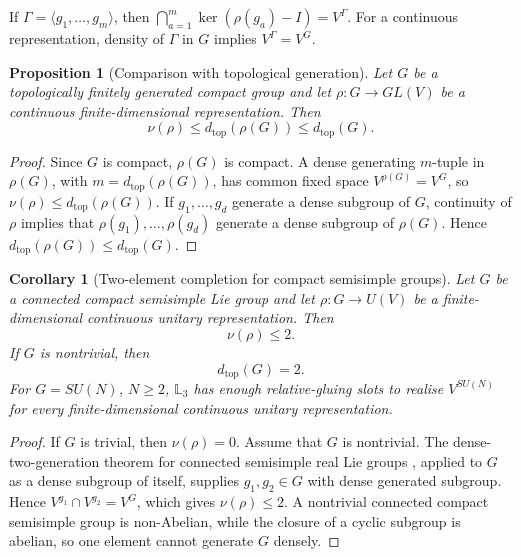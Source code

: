 \documentclass[11pt]{article}
\theoremstyle{plain}
\newtheorem{proposition}[theorem]{Proposition}
\newtheorem{corollary}[theorem]{Corollary}
\theoremstyle{definition}
\begin{document}
If
\(\Gamma=\langle g_1,\ldots,g_m\rangle\),
then
\(\bigcap_{a=1}^{m}\ker(\rho(g_a)-I)=V^\Gamma\).
For a continuous representation, density of \(\Gamma\) in \(G\) implies
\(V^\Gamma=V^G\).

\begin{proposition}[Comparison with topological generation]
\label{prop:completion-generation}
Let \(G\) be a topologically finitely generated compact group and let
\(\rho:G\to GL(V)\) be a continuous finite-dimensional representation. Then
\[
\nu(\rho)
\leq
d_{\mathrm{top}}(\rho(G))
\leq
d_{\mathrm{top}}(G).
\]
\end{proposition}

\begin{proof}
Since \(G\) is compact, \(\rho(G)\) is compact. A dense generating
\(m\)-tuple in \(\rho(G)\), with
\(m=d_{\mathrm{top}}(\rho(G))\), has common fixed space
\(V^{\rho(G)}=V^G\),
so
\(\nu(\rho)\leq d_{\mathrm{top}}(\rho(G))\).
If \(g_1,\ldots,g_d\) generate a dense subgroup of \(G\), continuity of
\(\rho\) implies that \(\rho(g_1),\ldots,\rho(g_d)\) generate a dense subgroup of \(\rho(G)\). Hence
\(d_{\mathrm{top}}(\rho(G))\leq d_{\mathrm{top}}(G)\).
\end{proof}

\begin{corollary}[Two-element completion for compact semisimple groups]
\label{cor:semisimple-two-completion}
Let \(G\) be a connected compact semisimple Lie group and let \(\rho:G\to U(V)\) be a finite-dimensional continuous unitary representation. Then
\[
\nu(\rho)\leq2.
\]
If \(G\) is nontrivial, then
\[
d_{\mathrm{top}}(G)=2.
\]
For \(G=SU(N)\), \(N\geq2\), \(\mathbb L_3\) has enough relative-gluing slots to realise \(V^{SU(N)}\) for every finite-dimensional continuous unitary representation.
\end{corollary}

\begin{proof}
If \(G\) is trivial, then \(\nu(\rho)=0\). Assume that \(G\) is nontrivial.
The dense-two-generation theorem for connected semisimple real Lie groups
\citep{BreuillardGelander2003,BreuillardGelander2026Revisited}, applied to \(G\) as a dense subgroup of
itself, supplies \(g_1,g_2\in G\) with dense generated subgroup. Hence
\(V^{g_1}\cap V^{g_2}=V^G\),
which gives \(\nu(\rho)\leq2\). A nontrivial connected compact semisimple group is non-Abelian, while the closure of a cyclic subgroup is abelian, so one element cannot generate \(G\) densely.
\end{proof}
\end{document}
